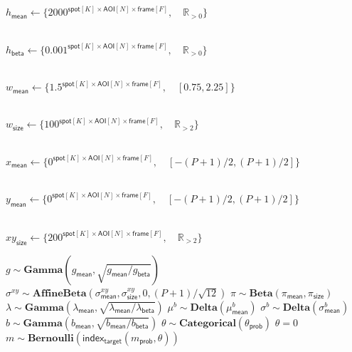 \begin{algorithmic}[1]
{    $h_\mathsf{mean} \gets \{ 2000^{\mathsf{spot}[K] \times \mathsf{AOI}[N] \times \mathsf{frame}[F]}, \quad \mathbb{R}_{>0} \} $ \rule{0pt}{3ex} \\
    $h_\mathsf{beta} \gets \{ 0.001^{\mathsf{spot}[K] \times \mathsf{AOI}[N] \times \mathsf{frame}[F]}, \quad \mathbb{R}_{>0} \} $ \rule{0pt}{3ex} \\
    $w_\mathsf{mean} \gets \{ 1.5^{\mathsf{spot}[K] \times \mathsf{AOI}[N] \times \mathsf{frame}[F]}, \quad [0.75, 2.25] \} $ \rule{0pt}{3ex} \\
    $w_\mathsf{size} \gets \{ 100^{\mathsf{spot}[K] \times \mathsf{AOI}[N] \times \mathsf{frame}[F]}, \quad \mathbb{R}_{>2} \} $ \rule{0pt}{3ex} \\
    $x_\mathsf{mean} \gets \{ 0^{\mathsf{spot}[K] \times \mathsf{AOI}[N] \times \mathsf{frame}[F]}, \quad [-(P+1)/2, (P+1)/2] \} $ \rule{0pt}{3ex} \\
    $y_\mathsf{mean} \gets \{ 0^{\mathsf{spot}[K] \times \mathsf{AOI}[N] \times \mathsf{frame}[F]}, \quad [-(P+1)/2, (P+1)/2] \} $ \rule{0pt}{3ex} \\
    $xy_\mathsf{size} \gets \{ 200^{\mathsf{spot}[K] \times \mathsf{AOI}[N] \times \mathsf{frame}[F]}, \quad \mathbb{R}_{>2} \} $ \rule{0pt}{3ex}
    }
\State $g \sim \mathbf{Gamma}(g_\mathsf{mean}, \sqrt{g_\mathsf{mean} / g_\mathsf{beta}})$
\State $\sigma^{xy} \sim \mathbf{AffineBeta}(\sigma^{xy}_\mathsf{mean}, \sigma^{xy}_\mathsf{size}, 0, (P+1) / \sqrt{12})$
\State $\pi \sim \mathbf{Beta}(\pi_\mathsf{mean}, \pi_\mathsf{size})$
\State $\lambda \sim \mathbf{Gamma}(\lambda_\mathsf{mean}, \sqrt{\lambda_\mathsf{mean} / \lambda_\mathsf{beta}})$
    \State $\mu^b \sim \mathbf{Delta}(\mu^b_\mathsf{mean})$
    \State $\sigma^b \sim \mathbf{Delta}(\sigma^b_\mathsf{mean})$
        \State $b \sim \mathbf{Gamma}(b_\mathsf{mean}, \sqrt{b_\mathsf{mean} / b_\mathsf{beta}})$
            \State $\theta \sim \mathbf{Categorical}\left( \theta_\mathsf{prob} \right)$
            \State $\theta = 0$
        \EndIf
            \State $m \sim \mathbf{Bernoulli}(\mathsf{index}_\mathsf{target} (m_\mathsf{prob}, \theta))$

\end{algorithmic}
